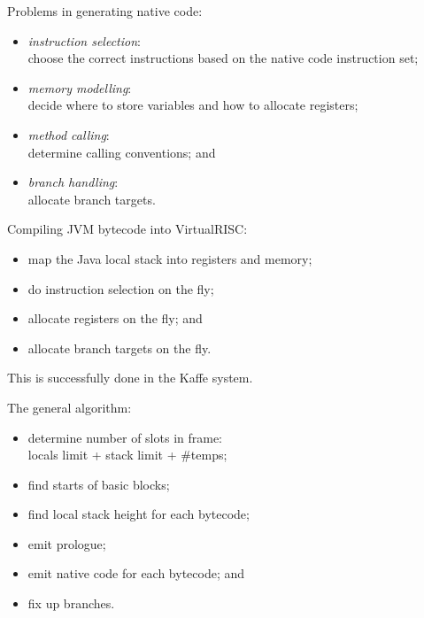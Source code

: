 \begin{slide*}
Problems in generating native code:\\

\begin{itemize}
\item {\em instruction selection}:\\ choose the correct instructions based
                                      on the native code instruction set;
\item {\em memory modelling}:\\ 
                                   decide where to store variables and how to allocate registers;
\item {\em method calling}:\\ determine calling conventions; and
\item {\em branch handling}:\\ allocate branch targets.
\end{itemize}
\vfil
\end{slide*}
 
\begin{slide*}
Compiling JVM bytecode into VirtualRISC:\\

\begin{itemize}
\item map the Java local stack into registers and memory;
\item do instruction selection on the fly;
\item allocate registers on the fly; and
\item allocate branch targets on the fly.
\end{itemize}
\vspace*{2em}

This is successfully done in the Kaffe system.
\vfil
\end{slide*}

\begin{slide*}
The general algorithm:\\

\begin{itemize}
\item determine number of slots in frame:\\
      locals limit + stack limit + \#temps;
\item find starts of basic blocks;
\item find local stack height for each bytecode;
\item emit prologue;
\item emit native code for each bytecode; and
\item fix up branches.
\end{itemize}
\vfil
\end{slide*}

